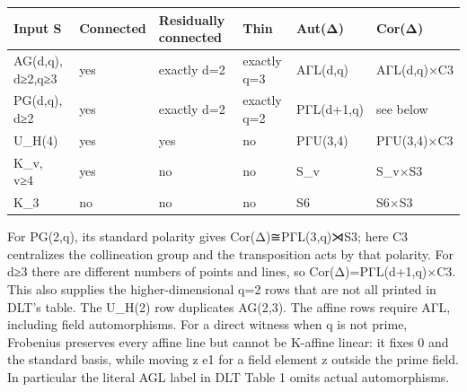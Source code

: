 \documentclass[
  11pt,
  a4paper,
]{article}
\newcounter{none} %
\begin{document}
{\small{} %
\begin{longtable}[]{@{}
  >{\raggedright\arraybackslash}p{}
  >{\centering\arraybackslash}p{}
  >{\centering\arraybackslash}p{}
  >{\centering\arraybackslash}p{}
  >{\raggedright\arraybackslash}p{}
  >{\raggedright\arraybackslash}p{}@{}}
\toprule\noalign{}
\begin{minipage}[b]{\linewidth}\raggedright
Input S
\end{minipage} & \begin{minipage}[b]{\linewidth}\centering
Connected
\end{minipage} & \begin{minipage}[b]{\linewidth}\centering
Residually connected
\end{minipage} & \begin{minipage}[b]{\linewidth}\centering
Thin
\end{minipage} & \begin{minipage}[b]{\linewidth}\raggedright
Aut(Δ)
\end{minipage} & \begin{minipage}[b]{\linewidth}\raggedright
Cor(Δ)
\end{minipage} \\
\midrule\noalign{}
\endhead
\bottomrule\noalign{}
\endlastfoot
AG(d,q), d≥2,q≥3 & yes & exactly d=2 & exactly q=3 & AΓL(d,q) &
AΓL(d,q)×C3 \\
PG(d,q), d≥2 & yes & exactly d=2 & exactly q=2 & PΓL(d+1,q) & see
below \\
U\_H(4) & yes & yes & no & PΓU(3,4) & PΓU(3,4)×C3 \\
K\_v, v≥4 & yes & no & no & S\_v & S\_v×S3 \\
K\_3 & no & no & no & S6 & S6×S3 \\
\end{longtable}
}

For PG(2,q), its standard polarity gives Cor(Δ)≅PΓL(3,q)⋊S3; here C3
centralizes the collineation group and the transposition acts by that
polarity. For d≥3 there are different numbers of points and lines, so
Cor(Δ)=PΓL(d+1,q)×C3. This also supplies the higher-dimensional q=2 rows
that are not all printed in DLT's table. The U\_H(2) row duplicates
AG(2,3). The affine rows require AΓL, including field automorphisms. For
a direct witness when q is not prime, Frobenius preserves every affine
line but cannot be K-affine linear: it fixes 0 and the standard basis,
while moving z e1 for a field element z outside the prime field. In
particular the literal AGL label in DLT Table 1 omits actual
automorphisms.
\end{document}
